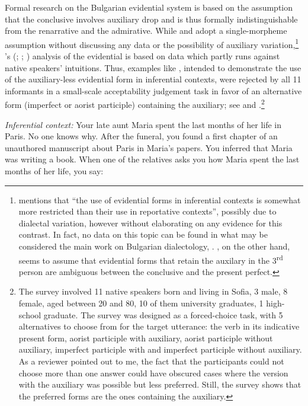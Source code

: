 \documentclass[output=paper,
colorlinks,
citecolor=brown,
newtxmath
]{langscibook}
\begin{document}
Formal research on the Bulgarian evidential system is based on the assumption that the conclusive involves auxiliary drop and is thus formally indistinguishable from the renarrative and the admirative. While \citet{Izvorski1997} and \citet{Koev2017} adopt a single-morpheme assumption without discussing any data or the possibility of auxiliary variation,\footnote{\citet[3, fn. 2]{Koev2017} mentions that ``the use of evidential forms in inferential contexts is somewhat more restricted than their use in reportative contexts'', possibly due to dialectal variation, however without elaborating on any evidence for this contrast. In fact, no data on this topic can be found in what may be considered the main work on Bulgarian dialectology, \citet{Stoykov2002}. \citet{Izvorski1997}, on the other hand, seems to assume that evidential forms that retain the auxilary in the 3\textsuperscript{rd} person are ambiguous between the conclusive and the present perfect.}
\citeauthor{Smirnova2013}'s (\citeyear{Smirnova2011a}; \citeyear{Smirnova2011b}; \citeyear{Smirnova2013}) analysis of the evidential is based on data which partly runs against native speakers' intuitions. Thus, examples like , intended to demonstrate the use of the auxiliary-less evidential form in inferential contexts, were rejected by all 11 informants in a small-scale acceptability judgement task in favor of an alternative form (imperfect or aorist participle) containing the auxiliary; see  and .\footnote{The survey involved 11 native speakers born and living in Sofia, 3 male, 8 female, aged between 20 and 80, 10 of them university graduates, 1 high-school graduate. The survey was designed as a forced-choice task, with 5 alternatives to choose from for the target utterance: the verb in its indicative present form, aorist participle with auxiliary, aorist participle without auxiliary, imperfect participle with and imperfect participle without auxiliary. As a reviewer pointed out to me, the fact that the participants could not choose more than one answer could have obscured cases where the version with the auxiliary was possible but less preferred. Still, the survey shows that the preferred forms are the ones containing the auxiliary.}

\eanoraggedright \textit{Inferential context:} Your late aunt Maria spent the
last months of her life in Paris. No one knows why. After the
funeral, you found a first chapter of an unauthored manuscript about Paris in Maria’s papers. You inferred that Maria was writing a book. When one of the relatives asks you how Maria spent the last months of her life, you say:\vspace{-6pt}\label{smirnova:infer-acceptability}
\z
\begin{exe}
\end{exe}
\end{document}
